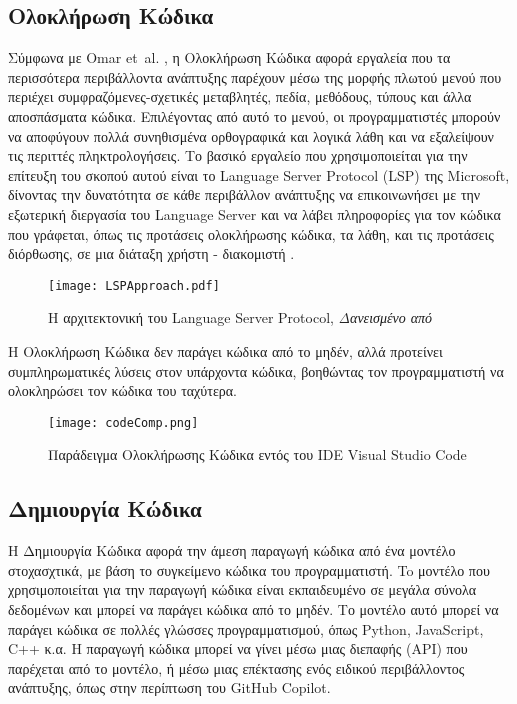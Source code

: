 \subsection*{Ολοκλήρωση Κώδικα} Σύμφωνα με
\textlatin{Omar et~al.} \cite{Omar2012}, η Ολοκλήρωση Κώδικα
αφορά εργαλεία που τα περισσότερα περιβάλλοντα ανάπτυξης παρέχουν μέσω
της μορφής πλωτού μενού που περιέχει συμφραζόμενες-σχετικές μεταβλητές,
πεδία, μεθόδους, τύπους και άλλα αποσπάσματα κώδικα. Επιλέγοντας από
αυτό το μενού, οι προγραμματιστές μπορούν να αποφύγουν πολλά συνηθισμένα
ορθογραφικά και λογικά λάθη και να εξαλείψουν τις περιττές
πληκτρολογήσεις. Το βασικό εργαλείο που χρησιμοποιείται για την επίτευξη
του σκοπού αυτού είναι το \textlatin{Language Server Protocol (LSP)} της
\textlatin{Microsoft}, δίνοντας την δυνατότητα σε κάθε περιβάλλον
ανάπτυξης να επικοινωνήσει με την εξωτερική διεργασία του
\textlatin{Language Server} και να λάβει πληροφορίες για τον κώδικα που
γράφεται, όπως τις προτάσεις ολοκλήρωσης κώδικα, τα λάθη, και τις
προτάσεις διόρθωσης, σε μια διάταξη χρήστη - διακομιστή \cite{Rask2022,
Bunder2019}.

\begin{figure}[H]
  \begin{center}
    \texttt{[image: LSPApproach.pdf]}
    \label{fig:LSP_architecture}
    \caption{Η αρχιτεκτονική του \textlatin{Language Server Protocol},
    \textit{Δανεισμένο από \cite{Rodriguez-Echeverria2018}}}
  \end{center}
\end{figure}

Η Ολοκλήρωση Κώδικα δεν παράγει κώδικα από το μηδέν, αλλά προτείνει
συμπληρωματικές λύσεις στον υπάρχοντα κώδικα, βοηθώντας τον
προγραμματιστή να ολοκληρώσει τον κώδικα του ταχύτερα.

\begin{figure}[H]
  \begin{center}
    \texttt{[image: codeComp.png]}
    \label{fig:codeComp}
    \caption{Παράδειγμα Ολοκλήρωσης Κώδικα εντός του \textlatin{IDE}
    \textlatin{Visual Studio Code} }
  \end{center}
\end{figure}

\subsection*{Δημιουργία Κώδικα} Η Δημιουργία Κώδικα αφορά την άμεση
παραγωγή κώδικα από ένα μοντέλο στοχασχτικά, με βάση το συγκείμενο
κώδικα του προγραμματιστή. To μοντέλο που χρησιμοποιείται για την
παραγωγή κώδικα είναι εκπαιδευμένο σε μεγάλα σύνολα δεδομένων και μπορεί
να παράγει κώδικα από το μηδέν. Το μοντέλο αυτό μπορεί να παράγει κώδικα
σε πολλές γλώσσες προγραμματισμού, όπως \textlatin{Python, JavaScript,
C++} κ.α. Η παραγωγή κώδικα μπορεί να γίνει μέσω μιας διεπαφής
\textlatin{(API)} που παρέχεται από το μοντέλο, ή μέσω μιας επέκτασης
ενός ειδικού περιβάλλοντος ανάπτυξης, όπως στην περίπτωση του
\textlatin{GitHub Copilot}.

